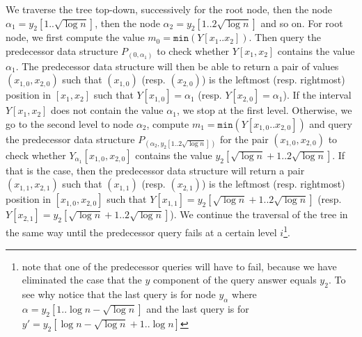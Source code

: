 \documentclass[11pt,runningheads]{llncs}
\begin{document}
We traverse the tree top-down, successively for the root node, 
then the node $\alpha_1=y_2[1..\sqrt{\log n}]$, then the node $\alpha_2=y_2[1..2\sqrt{\log n}]$
and so on. For root node, we first compute the value $m_0=\mathtt{min}(Y[x_1..x_2])$. 
Then query the predecessor data structure $P_{(0,\alpha_1)}$ to check whether 
$Y[x_1,x_2]$ contains the value $\alpha_1$. The predecessor data structure will then be able to return 
a pair of values $(x_{1,0},x_{2,0})$ such that $(x_{1,0})$ (resp. $(x_{2,0})$) 
is the leftmost (resp. rightmost) position in $[x_1,x_2]$ such that $Y[x_{1,0}]=\alpha_1$ 
(resp. $Y[x_{2,0}]=\alpha_1$). If the interval $Y[x_1,x_2]$ does not contain the value $\alpha_1$, 
we stop at the first level. Otherwise, we go to the second level to node $\alpha_2$, compute $m_1=\mathtt{min}(Y[x_{1,0}..x_{2,0}])$ and query the predecessor 
data structure $P_{(\alpha_2,y_2[1..2\sqrt{\log n}])}$ for the pair 
$(x_{1,0},x_{2,0})$ to check whether $Y_{\alpha_1}[x_{1,0},x_{2,0}]$
contains the value $y_2[\sqrt{\log n}+1..2\sqrt{\log n}]$. If that is the case, then
the predecessor data structure will return a pair $(x_{1,1},x_{2,1})$ such that 
$(x_{1,1})$ (resp. $(x_{2,1})$) is the leftmost (resp. rightmost) position 
in $[x_{1,0},x_{2,0}]$ such that $Y[x_{1,1}]=y_2[\sqrt{\log n}+1..2\sqrt{\log n}]$ 
(resp. $Y[x_{2,1}]=y_2[\sqrt{\log n}+1..2\sqrt{\log n}]$). We continue the traversal 
of the tree in the same way until the predecessor query fails at a certain level 
$i$\footnote{note that one of the predecessor queries will have to fail, because 
we have eliminated the case that the $y$ component of the query answer equals $y_2$. 
To see why notice that the last query is for node $y_\alpha$ 
where $\alpha=y_2[1..\log n-\sqrt{\log n}]$ and the last query 
is for $y'=y_2[\log n-\sqrt{\log n}+1..\log n]$}.
\end{document}
